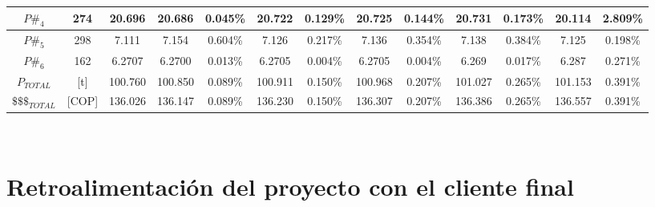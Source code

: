 \begin{table}
{\begin{tabular}{|cc|c|c|c|c|c|c|c|c|c|c|c|}
     \hline

     \cellcolor[HTML]{FFFE65}$P\#_{4}$ & \cellcolor[HTML]{FFFFC7}274 & \cellcolor[HTML]{FFD9AC}20.696 & \cellcolor[HTML]{BBFFBB}20.686 & \cellcolor[HTML]{BBFFBB}0.045\% & 20.722 & 0.129\% & 20.725 & 0.144\% & 20.731 & 0.173\% & \cellcolor[HTML]{FFD2B7}20.114 & \cellcolor[HTML]{FFD2B7}2.809\%\\

     \hline

     \cellcolor[HTML]{D34444}$P\#_{5}$ & \cellcolor[HTML]{FFCCC9}298 & \cellcolor[HTML]{FFD9AC}7.111 & \cellcolor[HTML]{BBFFBB}7.154 & \cellcolor[HTML]{BBFFBB}0.604\% & 7.126 & 0.217\% & 7.136 & 0.354\% & 7.138 & 0.384\% & \cellcolor[HTML]{FFD2B7}7.125 & \cellcolor[HTML]{FFD2B7}0.198\%\\

     \hline

     \cellcolor[HTML]{6665CD}$P\#_{6}$ & \cellcolor[HTML]{CBCEFB}162 & \cellcolor[HTML]{FFD9AC}6.2707 & \cellcolor[HTML]{BBFFBB}6.2700 & \cellcolor[HTML]{BBFFBB}0.013\% & 6.2705 & 0.004\% & 6.2705 & 0.004\% & 6.269 & 0.017\% & \cellcolor[HTML]{FFD2B7}6.287 & \cellcolor[HTML]{FFD2B7}0.271\%\\

     \hline
     \hline
     \hline

     \cellcolor[HTML]{EBEBEB}$P_{TOTAL}$ & \cellcolor[HTML]{EBEBEB}[t] & \cellcolor[HTML]{FFD9AC}100.760 & \cellcolor[HTML]{BBFFBB}100.850 & \cellcolor[HTML]{BBFFBB}0.089\% & 100.911 & 0.150\% & 100.968 & 0.207\% & 101.027 & 0.265\% & \cellcolor[HTML]{FFD2B7}101.153 & \cellcolor[HTML]{FFD2B7}0.391\% \\

     \hline

     \cellcolor[HTML]{EBEBEB}$\$\$\$_{TOTAL}$ & \cellcolor[HTML]{EBEBEB}[COP] & \cellcolor[HTML]{FFD9AC}136.026 & \cellcolor[HTML]{BBFFBB}136.147 & \cellcolor[HTML]{BBFFBB} 0.089\%& 136.230 & 0.150\% & 136.307 & 0.207\% & 136.386 & 0.265\% & \cellcolor[HTML]{FFD2B7}136.557 & \cellcolor[HTML]{FFD2B7} 0.391\%\\

     \hline


 \end{tabular}}
 \\
\end{table}

\pagebreak

\section{Retroalimentación del proyecto con el cliente final}

